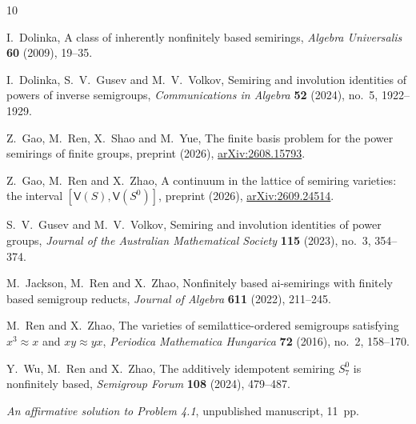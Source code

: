 \documentclass[10pt,a4paper]{amsart}
\numberwithin{equation}{section}
\newcommand{\Var}{\mathsf{V}}
\begin{document}
\clearpage
\begin{thebibliography}{10}

I.~Dolinka,
A class of inherently nonfinitely based semirings,
\emph{Algebra Universalis} \textbf{60} (2009), 19--35.

I.~Dolinka, S.~V.~Gusev and M.~V.~Volkov,
Semiring and involution identities of powers of inverse semigroups,
\emph{Communications in Algebra} \textbf{52} (2024), no.~5, 1922--1929.

Z.~Gao, M.~Ren, X.~Shao and M.~Yue,
The finite basis problem for the power semirings of finite groups,
preprint (2026),
\href{https://arxiv.org/abs/2608.15793}{arXiv:2608.15793}.

Z.~Gao, M.~Ren and X.~Zhao,
A continuum in the lattice of semiring varieties: the interval $[\Var(S),\Var(S^0)]$,
preprint (2026),
\href{https://arxiv.org/abs/2609.24514}{arXiv:2609.24514}.

S.~V.~Gusev and M.~V.~Volkov,
Semiring and involution identities of power groups,
\emph{Journal of the Australian Mathematical Society} \textbf{115} (2023), no.~3, 354--374.

M.~Jackson, M.~Ren and X.~Zhao,
Nonfinitely based ai-semirings with finitely based semigroup reducts,
\emph{Journal of Algebra} \textbf{611} (2022), 211--245.

M.~Ren and X.~Zhao,
The varieties of semilattice-ordered semigroups satisfying $x^3\approx x$ and $xy\approx yx$,
\emph{Periodica Mathematica Hungarica} \textbf{72} (2016), no.~2, 158--170.

Y.~Wu, M.~Ren and X.~Zhao,
The additively idempotent semiring $S_7^0$ is nonfinitely based,
\emph{Semigroup Forum} \textbf{108} (2024), 479--487.

\emph{An affirmative solution to Problem 4.1},
unpublished manuscript, 11~pp.

\end{thebibliography}
\end{document}
